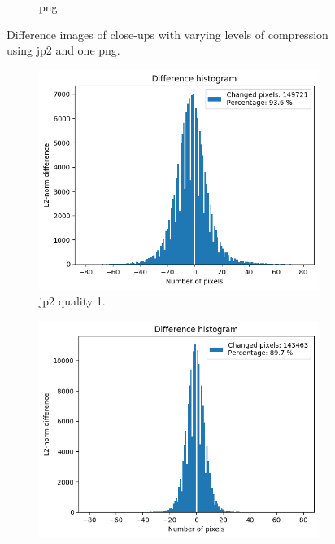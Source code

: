 \begin{figure}[htb]
\begin{subfigure}[b]{0.49\textwidth}
            \caption{\gls{png}}
            \label{fig:img_quality_center_heatmap_png}
        \end{subfigure}
    \caption{Difference images of close-ups with varying levels of compression using \gls{jp2} and one \gls{png}.}
    \label{fig:img_quality_center_heatmap}
\end{figure}

\begin{figure}[htb]
    \centering
        \begin{subfigure}[b]{0.49\textwidth}
            \centering
            \includegraphics[width=\textwidth]{doc/thesis/0_figures/compare_quality/set1/histograms/jp2_1_center_diff_histogram.png}
            \caption{\gls{jp2} quality 1.}
            \label{fig:img_quality_center_histogram_1}
        \end{subfigure}
        \begin{subfigure}[b]{0.49\textwidth}
            \centering
            \includegraphics[width=\textwidth]{doc/thesis/0_figures/compare_quality/set1/histograms/jp2_5_center_diff_histogram.png}

\end{subfigure}
\end{figure}
